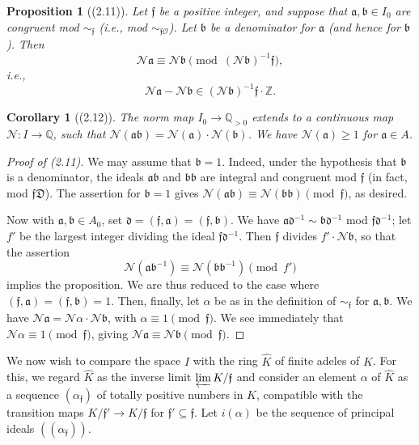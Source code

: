 \documentclass[12pt,a4paper]{article}
\theoremstyle{plain}
\newtheorem{proposition}[theorem]{Proposition}
\newtheorem{corollary}[theorem]{Corollary}
\theoremstyle{definition}
\newcommand{\OO}{\mathcal{O}}
\newcommand{\DD}{\mathfrak{D}}
\newcommand{\ff}{\mathfrak{f}}
\newcommand{\Z}{\mathbb{Z}}
\newcommand{\Q}{\mathbb{Q}}
\begin{document}
\begin{proposition}[(2.11)]\label{prop:norm}
Let $\ff$ be a positive integer, and suppose that $\mathfrak{a},\mathfrak{b}\in I_0$ are congruent mod $\sim_{\ff}$ (i.e., mod $\sim_{\ff\OO}$). Let $\mathfrak{b}$ be a denominator for $\mathfrak{a}$ (and hence for $\mathfrak{b}$). Then
\[
\mathcal{N}\mathfrak{a}\equiv\mathcal{N}\mathfrak{b}\pmod{(\mathcal{N}\mathfrak{b})^{-1}\ff},
\]
i.e.,
\[
\mathcal{N}\mathfrak{a}-\mathcal{N}\mathfrak{b}\in(\mathcal{N}\mathfrak{b})^{-1}\ff\cdot\Z.
\]
\end{proposition}

\begin{corollary}[(2.12)]\label{cor:norm}
The norm map $I_0\to\Q_{>0}$ extends to a continuous map $\mathcal{N}:I\to\Q$, such that $\mathcal{N}(\mathfrak{a}\mathfrak{b})=\mathcal{N}(\mathfrak{a})\cdot\mathcal{N}(\mathfrak{b})$. We have $\mathcal{N}(\mathfrak{a})\ge1$ for $\mathfrak{a}\in A$.
\end{corollary}

\begin{proof}[Proof of (2.11)]
We may assume that $\mathfrak{b}=1$. Indeed, under the hypothesis that $\mathfrak{b}$ is a denominator, the ideals $\mathfrak{a}\mathfrak{b}$ and $\mathfrak{b}\mathfrak{b}$ are integral and congruent mod $\ff$ (in fact, mod $\ff\DD$). The assertion for $\mathfrak{b}=1$ gives $\mathcal{N}(\mathfrak{a}\mathfrak{b})\equiv\mathcal{N}(\mathfrak{b}\mathfrak{b})\pmod{\ff}$, as desired.

Now with $\mathfrak{a},\mathfrak{b}\in A_0$, set $\mathfrak{d}=(\ff,\mathfrak{a})=(\ff,\mathfrak{b})$. We have $\mathfrak{a}\mathfrak{d}^{-1}\sim\mathfrak{b}\mathfrak{d}^{-1}$ mod $\ff\mathfrak{d}^{-1}$; let $f'$ be the largest integer dividing the ideal $\ff\mathfrak{d}^{-1}$. Then $\ff$ divides $f'\cdot\mathcal{N}\mathfrak{b}$, so that the assertion
\[
\mathcal{N}(\mathfrak{a}\mathfrak{b}^{-1})\equiv\mathcal{N}(\mathfrak{b}\mathfrak{b}^{-1})\pmod{f'}
\]
implies the proposition. We are thus reduced to the case where $(\ff,\mathfrak{a})=(\ff,\mathfrak{b})=1$. Then, finally, let $\alpha$ be as in the definition of $\sim_{\ff}$ for $\mathfrak{a},\mathfrak{b}$. We have $\mathcal{N}\mathfrak{a}=\mathcal{N}\alpha\cdot\mathcal{N}\mathfrak{b}$, with $\alpha\equiv1\pmod{\ff}$. We see immediately that $\mathcal{N}\alpha\equiv1\pmod{\ff}$, giving $\mathcal{N}\mathfrak{a}\equiv\mathcal{N}\mathfrak{b}\pmod{\ff}$.
\end{proof}

We now wish to compare the space $I$ with the ring $\hat{K}$ of finite adeles of $K$. For this, we regard $\hat{K}$ as the inverse limit $\varprojlim K/\ff$ and consider an element $\alpha$ of $\hat{K}$ as a sequence $(\alpha_{\ff})$ of totally positive numbers in $K$, compatible with the transition maps $K/\ff'\to K/\ff$ for $\ff'\subseteq\ff$. Let $i(\alpha)$ be the sequence of principal ideals $((\alpha_{\ff}))$.
\end{document}
